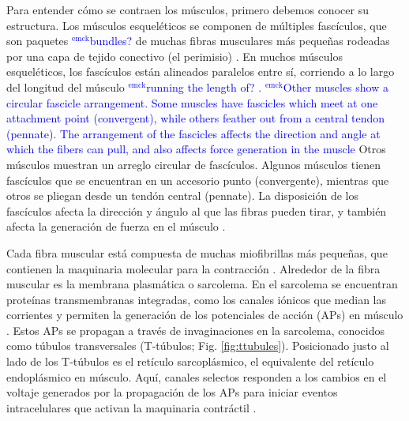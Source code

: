 \documentclass[12pt]{article}
\newcommand{\emck}[1]{\textcolor{blue}{$^{\textrm{emck}}${#1}}}
\begin{document}
Para entender cómo se contraen los músculos, primero debemos conocer
su estructura. Los músculos esqueléticos se componen de múltiples
fascículos, que son paquetes \emck{bundles?} de muchas fibras
musculares más pequeñas rodeadas por una capa de tejido conectivo (el
perimisio) \cite{openStax2016muscle}. En muchos músculos esqueléticos,
los fascículos están alineados paralelos entre sí, corriendo a lo
largo del longitud del músculo \emck{running the length of?}
\cite{openStax2016lever}. \emck{Other muscles show a circular fascicle
  arrangement. Some muscles have fascicles which meet at one
  attachment point (convergent), while others feather out from a
  central tendon (pennate). The arrangement of the fascicles affects
  the direction and angle at which the fibers can pull, and also
  affects force generation in the muscle} Otros músculos muestran un
arreglo circular de fascículos. Algunos músculos tienen fascículos que
se encuentran en un accesorio punto (convergente), mientras que otros
se pliegan desde un tendón central (pennate). La disposición de los
fascículos afecta la dirección y ángulo al que las fibras pueden
tirar, y también afecta la generación de fuerza en el músculo
\cite{openStax2016lever}.

Cada fibra muscular está compuesta de muchas miofibrillas más
pequeñas, que contienen la maquinaria molecular para la contracción
\cite{openStax2016muscle}. Alrededor de la fibra muscular es la
membrana plasmática o sarcolema. En el sarcolema se encuentran
proteínas transmembranas integradas, como los canales iónicos que
median las corrientes y permiten la generación de los potenciales de
acción (APs) en músculo \cite{openStax2016muscle}. Estos APs se
propagan a través de invaginaciones en la sarcolema, conocidos como
túbulos transversales (T-túbulos;
Fig. \ref{fig:ttubules}). Posicionado justo al lado de los T-túbulos
es el retículo sarcoplásmico, el equivalente del retículo endoplásmico
en músculo. Aquí, canales selectos responden a los cambios en el
voltaje generados por la propagación de los APs para iniciar eventos
intracelulares que activan la maquinaria contráctil
\cite{openStax2016muscle}.


\vspace{0.2cm}
\end{document}
